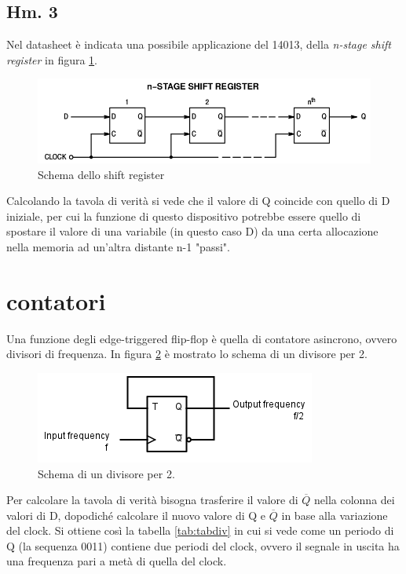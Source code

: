 \documentclass[journal, a4paper]{IEEEtran}
\begin{document}
\subsection{Hm. 3}

Nel datasheet è indicata una possibile applicazione del 14013, della \textit{n-stage shift register} in figura \ref{fig:shift}.

\begin{figure}[htp]
\centering
\includegraphics[scale=.3]{shift}
\caption{Schema dello shift register}
\label{fig:shift}
\end{figure}

Calcolando la tavola di verità si vede che il valore di Q coincide con quello di D iniziale, per cui la funzione di questo dispositivo potrebbe essere quello di spostare il valore di una variabile (in questo caso D) da una certa allocazione nella memoria ad un'altra distante n-1 "passi".

\section{contatori}

Una funzione degli edge-triggered flip-flop è quella di contatore asincrono, ovvero divisori di frequenza. In figura \ref{fig:div} è mostrato lo schema di un divisore per 2.

\begin{figure}[htp]
\centering
\includegraphics[scale=.6]{contatore}
\caption{Schema di un divisore per 2.}
\label{fig:div}
\end{figure}

Per calcolare la tavola di verità bisogna trasferire il valore di $\overline{Q}$ nella colonna dei valori di D, dopodiché calcolare il nuovo valore di Q e $\overline{Q}$ in base alla variazione del clock. Si ottiene così la tabella \ref{tab:tabdiv} in cui si vede come un periodo di Q (la sequenza 0011) contiene due periodi del clock, ovvero il segnale in uscita ha una frequenza pari a metà di quella del clock.
\end{document}
